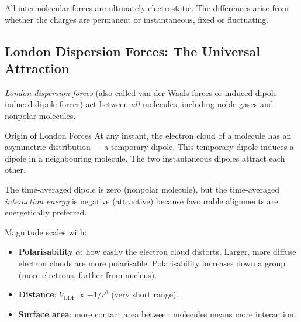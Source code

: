 \documentclass[12pt, a4paper]{book}
\newcommand{\newterm}[1]{\textit{\textcolor{DiscoveryColor}{#1}}}
\begin{document}
\vspace{0.5em}

All intermolecular forces are ultimately electrostatic.
The differences arise from whether the charges are permanent
or instantaneous, fixed or fluctuating.

\subsection{London Dispersion Forces: The Universal Attraction}

\newterm{London dispersion forces} (also called van der Waals
forces or induced dipole--induced dipole forces) act between
\emph{all} molecules, including noble gases and nonpolar molecules.

\begin{namedconcept}{Origin of London Forces}
At any instant, the electron cloud of a molecule has an
asymmetric distribution --- a temporary dipole.
This temporary dipole induces a dipole in a neighbouring molecule.
The two instantaneous dipoles attract each other.

The time-averaged dipole is zero (nonpolar molecule),
but the time-averaged \emph{interaction energy} is negative
(attractive) because favourable alignments are
energetically preferred.

Magnitude scales with:
\begin{itemize}[nosep, leftmargin=2em]
  \item \textbf{Polarisability} $\alpha$: how easily the electron
        cloud distorts. Larger, more diffuse electron clouds
        are more polarisable. Polarisability increases
        down a group (more electrons, farther from nucleus).
  \item \textbf{Distance}: $V_\text{LDF} \propto -1/r^6$
        (very short range).
  \item \textbf{Surface area}: more contact area between molecules
        means more interaction.
\end{itemize}
\end{namedconcept}
\end{document}
